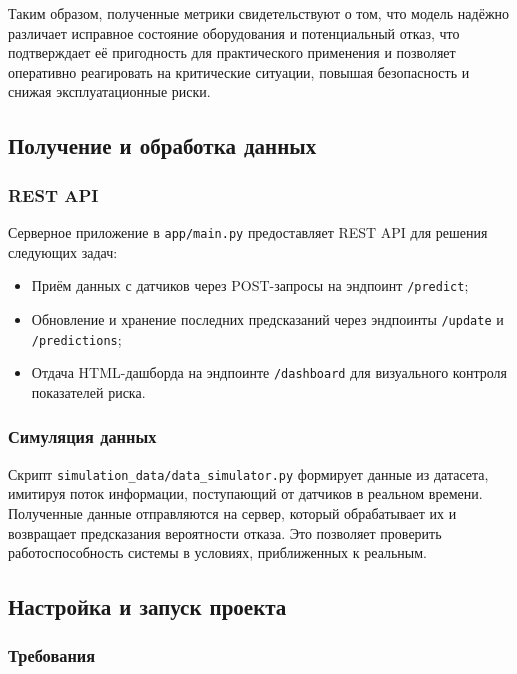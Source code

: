 \documentclass[a4paper,12pt]{article}
\begin{document}
\begin{flushleft}
Таким образом, полученные метрики свидетельствуют о том, что модель надёжно различает исправное состояние оборудования и потенциальный отказ, что подтверждает её пригодность для практического применения и позволяет оперативно реагировать на критические ситуации, повышая безопасность и снижая эксплуатационные риски.


    \subsection{Получение и обработка данных}

\subsubsection{REST API}

Серверное приложение в \texttt{app/main.py} предоставляет REST API для решения следующих задач:
\begin{itemize}
    \item Приём данных с датчиков через POST-запросы на эндпоинт \texttt{/predict};
    \item Обновление и хранение последних предсказаний через эндпоинты \texttt{/update} и \texttt{/predictions};
    \item Отдача HTML-дашборда на эндпоинте \texttt{/dashboard} для визуального контроля показателей риска.
\end{itemize}

\subsubsection{Симуляция данных}

Скрипт \texttt{simulation\_data/data\_simulator.py} формирует данные из датасета, имитируя поток информации, поступающий от датчиков в реальном времени. Полученные данные отправляются на сервер, который обрабатывает их и возвращает предсказания вероятности отказа. Это позволяет проверить работоспособность системы в условиях, приближенных к реальным.

\subsection{Настройка и запуск проекта}

\subsubsection{Требования}


\end{flushleft}
\end{document}
